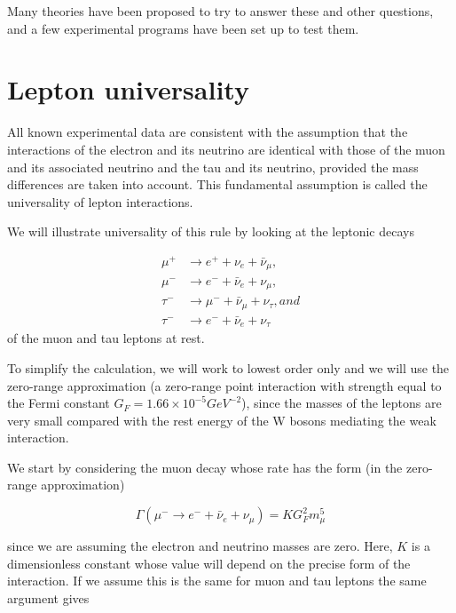 Many theories have been proposed to try to answer these and other questions, and a few experimental programs have been set up to test them. %

\section{Lepton universality}
	All known experimental data are consistent with the assumption that the interactions of the electron and its neutrino are identical with those of the muon and its associated neutrino and the tau and its neutrino, provided the mass differences are taken into account. This fundamental assumption is called the universality of lepton interactions.

	We will illustrate universality of this rule by looking at the leptonic decays \cite{MartinShaw}

	\begin{align}\label{eq2.4.1}
	\mu^{+}&\rightarrow e^{+} + \nu_{e} + \bar{\nu}_{\mu},\\
	\mu^{-}&\rightarrow e^{-} + \bar{\nu}_{e} + \nu_{\mu},\\
	\tau^{-}&\rightarrow \mu^{-} + \bar{\nu}_{\mu} + \nu_{\tau}, and\\
	\tau^{-}&\rightarrow e^{-} + \bar{\nu}_{e} + \nu_{\tau}
	\end{align}
	of the muon and tau leptons at rest. 

	To simplify the calculation, we will work to lowest order only and we will use the zero-range approximation (a zero-range point interaction with strength equal to the Fermi constant $G_{F}=1.66\times 10^{-5} GeV^{-2}$), since the masses of the leptons are very small compared with the rest energy of the W bosons mediating the weak interaction.

	We start by considering the muon decay whose rate has the form (in the zero-range approximation)

	\begin{equation}\label{eq2.4.2}
	\Gamma(\mu^{-}\rightarrow e^{-} + \bar{\nu}_{e} + \nu_{\mu}) = KG_{F}^{2}m_{\mu}^{5}
	\end{equation}

	since we are assuming the electron and neutrino masses are zero. Here, $K$ is a dimensionless constant whose value will depend on the precise form of the interaction. If we assume this is the same for muon and tau leptons the same argument gives

